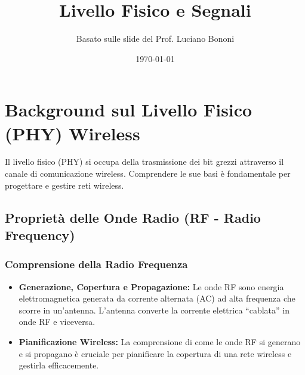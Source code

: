 

\title{Livello Fisico e Segnali}
\author{Basato sulle slide del Prof. Luciano Bononi}
\date{\today}



\maketitle
\tableofcontents
\newpage

\section{Background sul Livello Fisico (PHY) Wireless}
Il livello fisico (PHY) si occupa della trasmissione dei bit grezzi attraverso il canale di comunicazione wireless. Comprendere le sue basi è fondamentale per progettare e gestire reti wireless.

\subsection{Proprietà delle Onde Radio (RF - Radio Frequency)}

\subsubsection{Comprensione della Radio Frequenza}
\begin{itemize}
    \item \textbf{Generazione, Copertura e Propagazione:} Le onde RF sono energia elettromagnetica generata da corrente alternata (AC) ad alta frequenza che scorre in un'antenna. L'antenna converte la corrente elettrica ``cablata'' in onde RF e viceversa.
    \item \textbf{Pianificazione Wireless:} La comprensione di come le onde RF si generano e si propagano è cruciale per pianificare la copertura di una rete wireless e gestirla efficacemente.
\end{itemize}
\begin{center}
\end{center}

